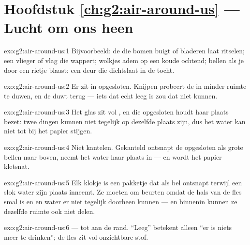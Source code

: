 \section*{Hoofdstuk \ref{ch:g2:air-around-us} --- Lucht om ons heen}

\begin{solution}{exo:g2:air-around-us:1}
Bijvoorbeeld: de  die bomen buigt of bladeren laat ritselen; een
vlieger of vlag die wappert; wolkjes adem op een koude ochtend; bellen
als je door een rietje blaast; een deur die dichtslaat in de tocht.
\end{solution}

\begin{solution}{exo:g2:air-around-us:2}
Er zit  in opgesloten. Knijpen probeert de  in minder
ruimte te duwen, en de  duwt terug --- iets dat echt leeg is zou
dat niet kunnen.
\end{solution}

\begin{solution}{exo:g2:air-around-us:3}
Het glas zit vol , en die opgesloten  houdt haar plaats
bezet: twee dingen kunnen niet tegelijk op dezelfde plaats zijn, dus
het water kan niet tot bij het papier stijgen.
\end{solution}

\begin{solution}{exo:g2:air-around-us:4}
Niet kantelen. Gekanteld ontsnapt de opgesloten  als grote bellen
naar boven, neemt het water haar plaats in --- en wordt het papier
kletsnat.
\end{solution}

\begin{solution}{exo:g2:air-around-us:5}
Elk klokje is een pakketje  dat als bel ontsnapt terwijl een slok
water zijn plaats inneemt. Ze moeten om beurten omdat de hals van de
fles smal is en  en water er niet tegelijk doorheen kunnen --- en
binnenin kunnen ze dezelfde ruimte ook niet delen.
\end{solution}

\begin{solution}{exo:g2:air-around-us:6}
 --- tot aan de rand. ``Leeg'' betekent alleen ``er is niets meer
te drinken''; de fles zit vol onzichtbare stof.
\end{solution}

